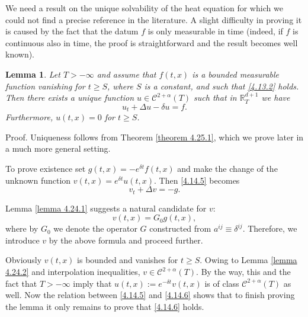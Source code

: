 \documentclass[reqno,12pt]{amsart}
\newtheorem{lemma}[theorem]{Lemma}
\theoremstyle{definition}
\theoremstyle{remark}
\begin{document}
   We  need
   a result on the unique solvability of the heat
   equation  for which we could not find a precise
    reference
    in  the literature.  A slight difficulty
in proving it is caused by  the fact that
   the datum $f$ is only measurable in time (indeed, if $f$ is
continuous
    also in time, the  proof is straightforward  and the result
    becomes well known).

   \begin{lemma}
                                        \label{lemma 4.14.1}
Let $T>-\infty$ and assume that $f(t,x)$ is a bounded measurable
function vanishing for $t\geq S$, where $S$ is a constant, and
such that \eqref{4.13.2} holds. Then there exists a unique
function $u\in{\mathcal{C}}^{2+\alpha}(T)$ such that in ${\mathbb{R}}^{d+1}_{T}$ we
have
\begin{equation}
                                                 \label{4.14.5}
u_{t}+\Delta u-\delta u=f.
\end{equation}
Furthermore, $u(t,x)=0$ for $t\geq S$.
\end{lemma}

Proof. Uniqueness follows from Theorem \ref{theorem 4.25.1}, which
we prove later in a much more general setting.

   To prove existence set $g(t,x)=-e^{\delta t}f(t,x)$
and make the change of the unknown function $v(t,x)=e^{\delta
t}u(t,x)$. Then \eqref{4.14.5} becomes
\begin{equation}
                                                 \label{4.14.6}
v_{t}+\Delta v =-g.
\end{equation}

Lemma \ref{lemma 4.24.1} suggests a natural candidate for $v$:
$$
v(t,x)=G_{0}g(t,x),
$$
where by $G_{0}$ we denote the operator $G$ constructed from
$a^{ij}\equiv\delta^{ij}$. Therefore, we introduce $v$ by the
above formula and proceed further.

Obviously $v(t,x)$
   is bounded and vanishes for $t\geq S$.
Owing to Lemma \ref{lemma 4.24.2} and interpolation inequalities,
$v\in{\mathcal{C}}^{2+\alpha}(T)$. By the way, this and the fact that
$T>-\infty$ imply that $u(t,x):=e^{-\delta t}v(t,x)$ is of class
${\mathcal{C}}^{2+\alpha}(T)$ as well. Now the relation between
\eqref{4.14.5} and \eqref{4.14.6} shows that to finish proving the
lemma it only remains to prove that \eqref{4.14.6} holds.
\end{document}
